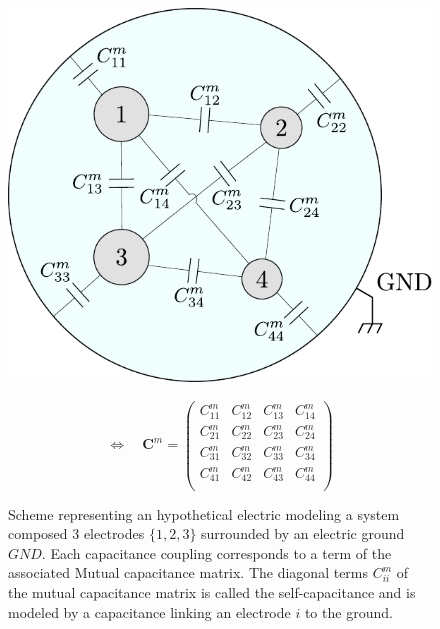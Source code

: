 \begin{figure}
\begin{minipage}{0.48\textwidth}
	\centering
    \includegraphics[width=\textwidth]{Figures/Electrodes/mutual_capacitance_scheme.pdf}
\end{minipage}
\begin{minipage}{0.48\textwidth}
	\begin{equation*}
	\Leftrightarrow \quad
	\bm{C}^m = 
	\begin{pmatrix}
	C_{11}^m & C_{12}^m & C_{13}^m & C_{14}^m \\ 
	C_{21}^m & C_{22}^m & C_{23}^m & C_{24}^m\\
	C_{31}^m & C_{32}^m & C_{33}^m & C_{34}^m \\
	C_{41}^m & C_{42}^m & C_{43}^m & C_{44}^m \\
	\end{pmatrix}
	\end{equation*}
\end{minipage}
\caption{Scheme representing an hypothetical electric modeling a system composed 3 electrodes $\{1,2,3\}$ surrounded by an electric ground $GND$. Each capacitance coupling corresponds to a term of the associated Mutual capacitance matrix. The diagonal terms $C_{ii}^m$ of the mutual capacitance matrix is called the self-capacitance and is modeled by a capacitance linking an electrode $i$ to the ground.}
\label{fig:lumped-capacitance}
\end{figure}

